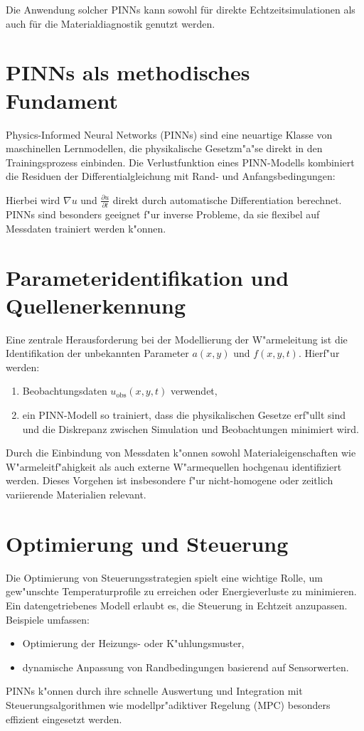 Die Anwendung solcher PINNs kann sowohl für direkte Echtzeitsimulationen als auch für die Materialdiagnostik genutzt werden.


\section*{PINNs als methodisches Fundament}
Physics-Informed Neural Networks (PINNs) sind eine neuartige Klasse von maschinellen Lernmodellen, die physikalische Gesetzm"a"se direkt in den Trainingsprozess einbinden. Die Verlustfunktion eines PINN-Modells kombiniert die Residuen der Differentialgleichung mit Rand- und Anfangsbedingungen:

Hierbei wird $\nabla u$ und $\frac{\partial u}{\partial t}$ direkt durch automatische Differentiation berechnet. PINNs sind besonders geeignet f"ur inverse Probleme, da sie flexibel auf Messdaten trainiert werden k"onnen.

\section*{Parameteridentifikation und Quellenerkennung}
Eine zentrale Herausforderung bei der Modellierung der W"armeleitung ist die Identifikation der unbekannten Parameter $a(x, y)$ und $f(x, y, t)$. Hierf"ur werden:
\begin{enumerate}
	\item Beobachtungsdaten $u_\text{obs}(x, y, t)$ verwendet,
	\item ein PINN-Modell so trainiert, dass die physikalischen Gesetze erf"ullt sind und die Diskrepanz zwischen Simulation und Beobachtungen minimiert wird.
\end{enumerate}
Durch die Einbindung von Messdaten k"onnen sowohl Materialeigenschaften wie W"armeleitf"ahigkeit als auch externe W"armequellen hochgenau identifiziert werden. Dieses Vorgehen ist insbesondere f"ur nicht-homogene oder zeitlich variierende Materialien relevant.

\section*{Optimierung und Steuerung}
Die Optimierung von Steuerungsstrategien spielt eine wichtige Rolle, um gew"unschte Temperaturprofile zu erreichen oder Energieverluste zu minimieren. Ein datengetriebenes Modell erlaubt es, die Steuerung in Echtzeit anzupassen. Beispiele umfassen:
\begin{itemize}
	\item Optimierung der Heizungs- oder K"uhlungsmuster,
	\item dynamische Anpassung von Randbedingungen basierend auf Sensorwerten.
\end{itemize}
PINNs k"onnen durch ihre schnelle Auswertung und Integration mit Steuerungsalgorithmen wie modellpr"adiktiver Regelung (MPC) besonders effizient eingesetzt werden.

